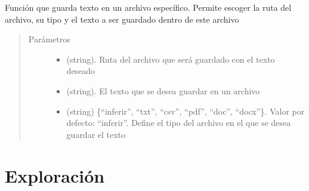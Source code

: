 \documentclass[letterpaper,10pt,openany,spanish]{sphinxmanual}
\begin{document}
\begin{fulllineitems}
\label{\detokenize{funciones/escritura:escritura.escribir_texto}}
Función que guarda texto en un archivo específico. Permite escoger la         ruta del archivo, su tipo y el texto a ser guardado dentro de este archivo
\begin{quote}\begin{description}
\item[{Parámetros}] \leavevmode\begin{itemize}
\item {} 
 \textendash{} (string). Ruta del archivo que será guardado         con el texto deseado

\item {} 
 \textendash{} (string). El texto que se desea guardar en un archivo

\item {} 
 \textendash{} (string) \{“inferir”, “txt”, “csv”, “pdf”, “doc”, “docx”\}. Valor por defecto: “inferir”.          Define el tipo del archivo en el que se desea guardar el texto

\end{itemize}

\end{description}\end{quote}

\end{fulllineitems}



\chapter{Exploración}
\label{\detokenize{funciones/exploracion:module-exploracion}}\label{\detokenize{funciones/exploracion:exploracion}}\label{\detokenize{funciones/exploracion::doc}}
\end{document}
